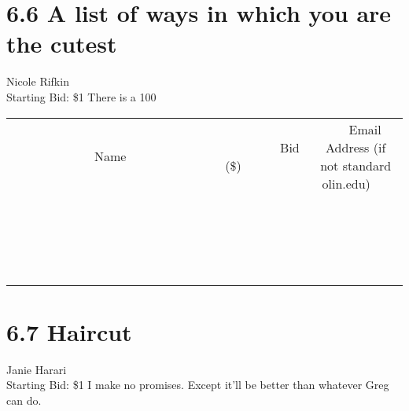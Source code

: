 \documentclass[11pt]{article}
\begin{document}
\section*{6.6 A list of ways in which you are the cutest}
Nicole Rifkin
\\
Starting Bid: \$1
\newline
There is a 100%
\\[3ex]
\begin{tabular}{c c c}
~~~~~~~~~~~~~Name~~~~~~~~~~~~~ & ~~~~~~~~~Bid (\$)~~~~~~~~~  & ~~~Email Address (if not standard olin.edu)~~~\\
 & & \\
\hline
 & & \\
\hline
 & & \\
\hline
 & & \\
\hline
 & & \\
\hline
 & & \\
\hline
 & & \\
\hline
 & & \\
\hline
 & & \\
\hline
 & & \\
\hline
 & & \\
\hline
 & & \\
\hline
 & & \\
\hline
 & & \\
\hline
 & & \\
\hline
 & & \\
\hline
 & & \\
\hline
 & & \\
\hline
 & & \\
\hline
\end{tabular}
\newpage
\section*{6.7 Haircut}
Janie Harari
\\
Starting Bid: \$1
\newline
I make no promises.  Except it'll be better than whatever Greg can do.
\end{document}
